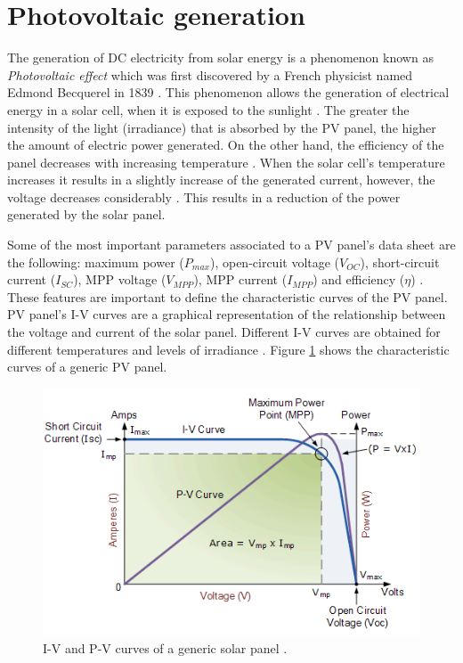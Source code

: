\section{Photovoltaic generation}

The generation of DC electricity from solar energy is a phenomenon known as \textit{Photovoltaic effect} which was first discovered by a French physicist named Edmond Becquerel in 1839 \cite{PVeffect}. This phenomenon allows the generation of electrical energy in a solar cell, when it is exposed to the sunlight \cite{PVeffect}. The greater the intensity of the light (irradiance) that is absorbed by the PV panel, the higher the amount of electric power generated. On the other hand, the efficiency of the panel decreases with increasing temperature \cite{handbook}. When the solar cell's temperature increases it results in a slightly increase of the generated current, however, the voltage decreases considerably \cite{handbook}. This results in a reduction of the power generated by the solar panel.

Some of the most important parameters associated to a PV panel’s data sheet are the following: maximum power ($P_{max}$), open-circuit voltage ($V_{OC}$), short-circuit current ($I_{SC}$), MPP voltage ($V_{MPP}$), MPP current ($I_{MPP}$) and efficiency ($\eta$) \cite{handbook}.
These features are important to define the characteristic curves of the PV panel. PV panel's I-V curves are a graphical representation of the relationship between the voltage and current of the solar panel. Different I-V curves are obtained for different temperatures and levels of irradiance \cite{IVcurves}. Figure \ref{fig:mpp} shows the characteristic curves of a generic PV panel. 

\begin{figure}[H]
	\begin{center}
		\includegraphics[width=0.8\linewidth]{../Pictures/IVcurve1}
		\caption{I-V and P-V curves of a generic solar panel \cite{IVcurves}.}
		\label{fig:mpp}
	\end{center}
\end{figure}


